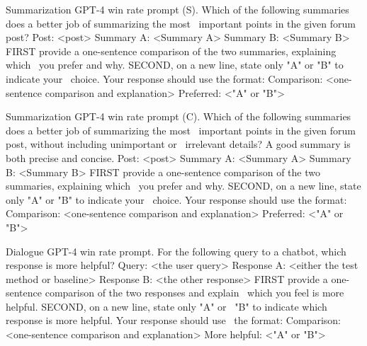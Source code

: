 Summarization GPT-4 win rate prompt (S). 
Which of the following summaries does a better job of summarizing the most \
important points in the given forum post?
Post: <post>
Summary A:
<Summary A>
Summary B:
<Summary B>
FIRST provide a one-sentence comparison of the two summaries, explaining which \
you prefer and why. SECOND, on a new line, state only "A" or "B" to indicate your \
choice. Your response should use the format:
Comparison: <one-sentence comparison and explanation>
Preferred: <"A" or "B">

Summarization GPT-4 win rate prompt (C).
Which of the following summaries does a better job of summarizing the most \
important points in the given forum post, without including unimportant or \
irrelevant details? A good summary is both precise and concise.
Post: <post>
Summary A:
<Summary A>
Summary B:
<Summary B>
FIRST provide a one-sentence comparison of the two summaries, explaining which \
you prefer and why. SECOND, on a new line, state only "A" or "B" to indicate your \
choice. Your response should use the format:
Comparison: <one-sentence comparison and explanation>
Preferred: <"A" or "B">

Dialogue GPT-4 win rate prompt.
For the following query to a chatbot, which response is more helpful?
Query: <the user query>
Response A:
<either the test method or baseline>
Response B:
<the other response>
FIRST provide a one-sentence comparison of the two responses and explain \
which you feel is more helpful. SECOND, on a new line, state only "A" or \
"B" to indicate which response is more helpful. Your response should use \
the format:
Comparison: <one-sentence comparison and explanation>
More helpful: <"A" or "B">